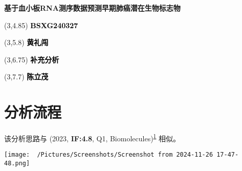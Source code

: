 \documentclass[
]{article}
\author{}
\date{\vspace{-2.5em}}
\begin{document}
\begin{titlepage} 
\begin{center} \textbf{\huge 基于血小板RNA测序数据预测早期肺癌潜在生物标志物}
\vspace{4em} \begin{textblock}{10}(3,4.85) \Large
\textbf{\textcolor{black}{BSXG240327}}
\end{textblock} \begin{textblock}{10}(3,5.8)
\Large \textbf{\textcolor{black}{黄礼闯}}
\end{textblock} \begin{textblock}{10}(3,6.75)
\Large
\textbf{\textcolor{black}{补充分析}}
\end{textblock} \begin{textblock}{10}(3,7.7)
\Large
\textbf{\textcolor{black}{陈立茂}}
\end{textblock} \end{center} \end{titlepage}
\restoregeometry


\begin{center}\vspace{1.5cm}\end{center}\tableofcontents

\begin{center}\vspace{1.5cm}\end{center}\listoffigures

\begin{center}\vspace{1.5cm}\end{center}\listoftables

\newpage


\hypertarget{abstract}{%
\section{分析流程}\label{abstract}}

该分析思路与 (2023, \textbf{IF:4.8}, Q1, Biomolecules)\textsuperscript{\protect\hyperlink{ref-HCC_RNA_Sequen_Wang_2023}{1}} 相似。

\begin{center}\vspace{1.5cm}\end{center}
\def\@captype{figure}
\begin{center}
\texttt{[image: ~/Pictures/Screenshots/Screenshot from 2024-11-26 17-47-48.png]}
\caption{Unnamed chunk 7}\label{fig:unnamed-chunk-7}
\end{center}
\end{document}
